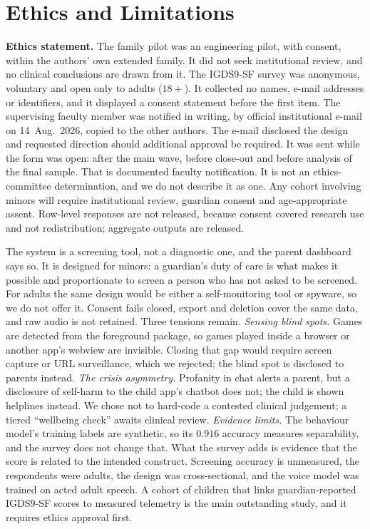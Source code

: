 \documentclass[conference]{IEEEtran}
\begin{document}
\section{Ethics and Limitations}\label{sec:ethics}
\textbf{Ethics statement.} The family pilot was an engineering pilot, with consent,
within the authors' own extended family. It did not seek institutional review, and no
clinical conclusions are drawn from it. The IGDS9-SF survey was anonymous, voluntary
and open only to adults ($18+$). It collected no names, e-mail addresses or
identifiers, and it displayed a consent statement before the first item. The
supervising faculty member was notified in writing, by official institutional e-mail on
14~Aug.~2026, copied to the other authors. The e-mail disclosed the design and
requested direction should additional approval be required. It was sent while the form
was open: after the main wave, before close-out and before analysis of the final
sample. That is documented faculty notification. It is not an ethics-committee
determination, and we do not describe it as one. Any cohort involving minors will
require institutional review, guardian consent and age-appropriate assent. Row-level
responses are not released, because consent covered research use and not
redistribution; aggregate outputs are released.

The system is a screening tool, not a diagnostic one, and the parent dashboard says
so. It is designed for minors: a guardian's duty of care is what makes it possible and
proportionate to screen a person who has not asked to be screened. For adults the same
design would be either a self-monitoring tool or spyware, so we do not offer it.
Consent fails closed, export and deletion cover the same data, and raw audio is not
retained. Three tensions remain. \emph{Sensing blind spots.} Games are detected from
the foreground package, so games played inside a browser or another app's webview are
invisible. Closing that gap would require screen capture or URL surveillance, which we
rejected; the blind spot is disclosed to parents instead. \emph{The crisis asymmetry.}
Profanity in chat alerts a parent, but a disclosure of self-harm to the child app's
chatbot does not; the child is shown helplines instead. We chose not to hard-code a
contested clinical judgement; a tiered ``wellbeing check'' awaits clinical review.
\emph{Evidence limits.} The behaviour model's training labels are synthetic, so its
$0.916$ accuracy measures separability, and the survey does not change that. What the
survey adds is evidence that the score is related to the intended construct. Screening
accuracy is unmeasured, the respondents were adults, the design was cross-sectional,
and the voice model was trained on acted adult speech. A cohort of children that links
guardian-reported IGDS9-SF scores to measured telemetry is the main outstanding study,
and it requires ethics approval first.
\end{document}
